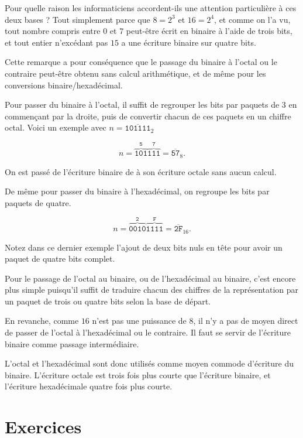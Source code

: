 \documentclass[class=report,crop=false]{standalone}
\begin{document}
Pour quelle raison les informaticiens accordent-ils une attention
particulière à ces deux bases ? Tout simplement parce que $8 = 2^3$ et
$16 = 2^4$, et comme on l'a vu,
tout nombre compris entre $0$ et $7$ peut-être écrit en binaire à l'aide de
trois bits, et tout entier n’excédant pas $15$ a une écriture
binaire sur quatre bits.

Cette remarque a pour conséquence que le passage du binaire à l'octal ou
le contraire peut-être obtenu sans calcul arithmétique, et de même pour
les conversions binaire/hexadécimal. 

Pour passer du binaire à l'octal, il suffit de regrouper les bits par
paquets de $3$ en commençant par la droite, puis de convertir chacun de
ces paquets en un chiffre octal. Voici un exemple avec
$n = \overline{\mathtt{101111}}_2$

\[n = \overbrace{\mathtt{101}}^\mathtt{5}\overbrace{\mathtt{111}}^\mathtt{7} = \overline{\mathtt{57}}_8.\]

On est passé de l'écriture binaire de  à son écriture octale
sans aucun calcul.

De même pour passer du binaire à l'hexadécimal, on regroupe les bits par
paquets de quatre.

\[n = \overbrace{\mathtt{0010}}^\mathtt{2}\overbrace{\mathtt{1111}}^\mathtt{F} = \overline{\mathtt{2F}}_{16}.\]

Notez dans ce dernier exemple l'ajout de deux bits nuls en tête pour
avoir un paquet de quatre bits complet.

Pour le passage de l'octal au binaire, ou de l'hexadécimal au binaire,
c'est encore plus simple puisqu'il suffit de traduire chacun des
chiffres de la représentation par un paquet de trois ou quatre bits
selon la base de départ.

En revanche, comme $16$ n'est pas
une puissance de $8$, il n'y a pas de moyen direct de passer de l'octal à
l'hexadécimal ou le contraire. Il faut se servir de l'écriture binaire
comme passage intermédiaire.

L'octal et l'hexadécimal sont donc utilisés comme moyen commode
d'écriture du binaire. L'écriture octale est trois fois plus courte que
l'écriture binaire, et l'écriture hexadécimale quatre fois plus courte.





\section{Exercices}
\end{document}
